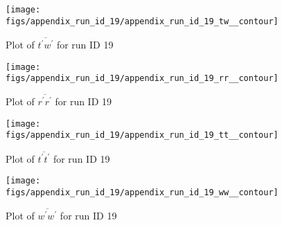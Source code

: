 \begin{figure}[H]
\centering
\texttt{[image: figs/appendix\_run\_id\_19/appendix\_run\_id\_19\_tw\_\_contour]}
\caption{Plot of $\overline{t^\prime w^\prime}$ for run ID 19}
\label{fig:appendix_run_id_19_tw__contour}
\end{figure}


\begin{figure}[H]
\centering
\texttt{[image: figs/appendix\_run\_id\_19/appendix\_run\_id\_19\_rr\_\_contour]}
\caption{Plot of $\overline{r^\prime r^\prime}$ for run ID 19}
\label{fig:appendix_run_id_19_rr__contour}
\end{figure}


\begin{figure}[H]
\centering
\texttt{[image: figs/appendix\_run\_id\_19/appendix\_run\_id\_19\_tt\_\_contour]}
\caption{Plot of $\overline{t^\prime t^\prime}$ for run ID 19}
\label{fig:appendix_run_id_19_tt__contour}
\end{figure}


\begin{figure}[H]
\centering
\texttt{[image: figs/appendix\_run\_id\_19/appendix\_run\_id\_19\_ww\_\_contour]}
\caption{Plot of $\overline{w^\prime w^\prime}$ for run ID 19}
\label{fig:appendix_run_id_19_ww__contour}
\end{figure}


